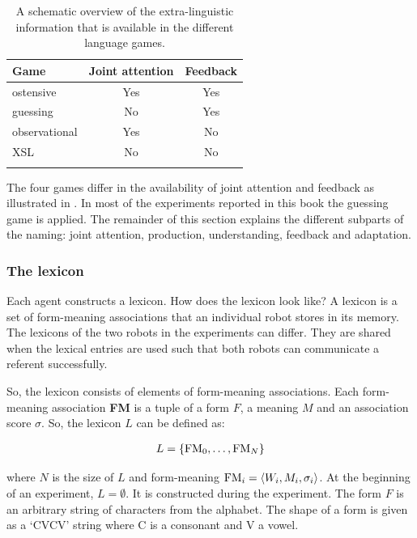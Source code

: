 \begin{table}[t]
\centering
\begin{tabular}{lcc}
\lsptoprule
Game & Joint attention & Feedback\\
\midrule
ostensive & Yes & Yes\\
guessing & No & Yes\\
observational & Yes & No\\
XSL & No & No\\
\lspbottomrule
\end{tabular}
\caption{A schematic overview of the extra-linguistic information that is available in the different language games.}
\label{t:cm:games}
\end{table}


The four games differ in the availability of joint attention and feedback as illustrated in . In most of the experiments reported in this book the guessing game is applied. The remainder of this section explains the different subparts of the naming: joint attention, production, understanding, feedback and adaptation.

\subsubsection{The lexicon}

Each agent constructs a lexicon. How does the lexicon look like? A lexicon is a set of form-meaning associations that an individual robot stores in its memory. The lexicons of the two robots in the experiments can differ. They are shared when the lexical entries are used such that both robots can communicate a referent successfully. 

So, the lexicon consists of elements of form-meaning associations. Each form-meaning association {\bf FM} is a tuple of a form $F$, a meaning $M$ and an association score $\sigma$. So, the lexicon $L$ can be defined as:

\begin{eqnarray}
L=\{{\bf \mbox{FM}}_0, \ldots, {\bf \mbox{FM}}_N\}
\end{eqnarray}

\noindent
where $N$ is the size of $L$ and form-meaning ${\bf \mbox{FM}}_i=\langle W_i,M_i,\sigma_i\rangle$. At the beginning of an experiment, $L=\emptyset$. It is constructed during the experiment. The form $F$ is an arbitrary string of characters from the alphabet. The shape of a form is given as a `CVCV' string where C is a consonant and V a vowel.

